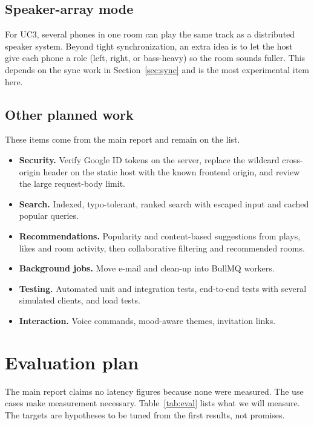 \documentclass[11pt,a4paper]{article}
\begin{document}
\subsection{Speaker-array mode}
For UC3, several phones in one room can play the same track as a distributed speaker
system. Beyond tight synchronization, an extra idea is to let the host give each phone a
role (left, right, or bass-heavy) so the room sounds fuller. This depends on the
sync work in Section~\ref{sec:sync} and is the most experimental item here.

\subsection{Other planned work}
These items come from the main report and remain on the list.
\begin{itemize}
  \item \textbf{Security.} Verify Google ID tokens on the server, replace the wildcard
        cross-origin header on the static host with the known frontend origin, and review
        the large request-body limit.
  \item \textbf{Search.} Indexed, typo-tolerant, ranked search with escaped input and cached
        popular queries.
  \item \textbf{Recommendations.} Popularity and content-based suggestions from plays,
        likes and room activity, then collaborative filtering and recommended rooms.
  \item \textbf{Background jobs.} Move e-mail and clean-up into BullMQ workers.
  \item \textbf{Testing.} Automated unit and integration tests, end-to-end tests with
        several simulated clients, and load tests.
  \item \textbf{Interaction.} Voice commands, mood-aware themes, invitation links.
\end{itemize}

\section{Evaluation plan}\label{sec:eval}
The main report claims no latency figures because none were measured. The use cases make
measurement necessary. Table~\ref{tab:eval} lists what we will measure. The targets are
hypotheses to be tuned from the first results, not promises.
\end{document}
